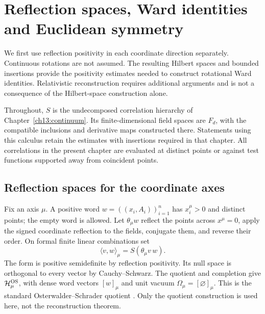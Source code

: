 \chapter[Reflection spaces and Ward identities]{Reflection spaces, Ward identities and Euclidean symmetry}
\label{ch14:ward}

We first use reflection positivity in each coordinate direction
separately. Continuous rotations are not assumed. The resulting
Hilbert spaces and bounded insertions provide the positivity estimates
needed to construct rotational Ward identities. Relativistic
reconstruction requires additional arguments and is not a consequence
of the Hilbert-space construction alone.

Throughout, $S$ is the undecomposed correlation hierarchy of
Chapter~\ref{ch13:continuum}. Its finite-dimensional field spaces are
$F_d$, with the compatible inclusions and derivative maps
constructed there. Statements using this calculus retain the
estimates with insertions required in that chapter. All correlations in the
present chapter are evaluated at distinct points or against test functions
supported away from coincident points.

\section{Reflection spaces for the coordinate axes}
\label{ch14:reflection}

Fix an axis $\mu$. A positive word $w=((x_i,A_i))_{i=1}^n$ has
$x_i^\mu>0$ and distinct points; the empty word is allowed.
Let $\theta_\mu w$ reflect the points across $x^\mu=0$, apply the
signed coordinate reflection to the fields, conjugate them, and
reverse their order. On formal finite linear combinations set
\[
 \langle v,w\rangle_\mu=S(\theta_\mu v\,w).
\]
The form is positive semidefinite by reflection positivity. Its null
space is orthogonal to every vector by Cauchy--Schwarz. The quotient
and completion give $\mathcal H_\mu^{\rm OS}$, with dense word
vectors $[w]_\mu$ and unit vacuum $\Omega_\mu=[\varnothing]_\mu$.
This is the standard Osterwalder--Schrader quotient
\cite[Section3]{OsterwalderSchrader1973}. Only the quotient
construction is used here, not the reconstruction theorem.

